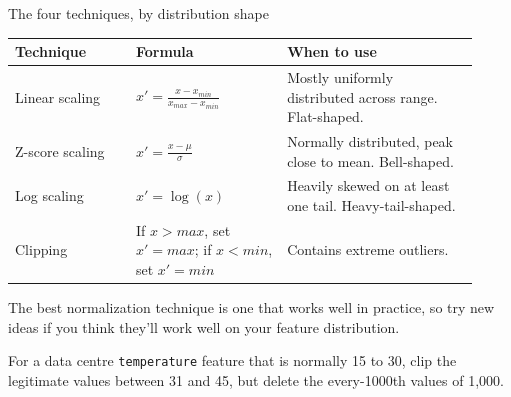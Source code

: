 \begin{frame}{The four techniques, by distribution shape}
  \begin{withmargin}
    \begin{tdmain}
      \footnotesize
      \begin{tabular}{@{}p{0.24\linewidth}p{0.30\linewidth}p{0.38\linewidth}@{}}
        \toprule
        \textbf{Technique} & \textbf{Formula} & \textbf{When to use}\\
        \midrule
        Linear scaling & $x' = \frac{x - x_{min}}{x_{max} - x_{min}}$
          & Mostly uniformly distributed across range. Flat-shaped.\\[0.5em]
        Z-score scaling & $x' = \frac{x - \mu}{\sigma}$
          & Normally distributed, peak close to mean. Bell-shaped.\\[0.5em]
        Log scaling & $x' = \log(x)$
          & Heavily skewed on at least one tail. Heavy-tail-shaped.\\[0.5em]
        Clipping & If $x > max$, set $x' = max$; if $x < min$, set $x' = min$
          & Contains extreme outliers.\\
        \bottomrule
      \end{tabular}
    \end{tdmain}
    \begin{tdmargin}
      The best normalization technique is one that works well in practice, so
      try new ideas if you think they'll work well on your feature distribution.
      \par\medskip
       For a data
      centre \texttt{temperature} feature that is normally 15 to 30, clip the
      legitimate values between 31 and 45, but delete the every-1000th values of
      1{,}000.
    \end{tdmargin}
  \end{withmargin}
\end{frame}

